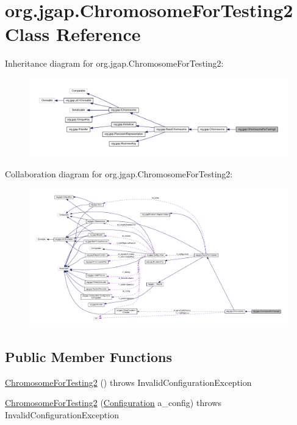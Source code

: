 \hypertarget{classorg_1_1jgap_1_1_chromosome_for_testing2}{\section{org.\-jgap.\-Chromosome\-For\-Testing2 Class Reference}
\label{classorg_1_1jgap_1_1_chromosome_for_testing2}
}


Inheritance diagram for org.\-jgap.\-Chromosome\-For\-Testing2\-:
\nopagebreak
\begin{figure}[H]
\begin{center}
\leavevmode
\includegraphics[width=350pt]{classorg_1_1jgap_1_1_chromosome_for_testing2__inherit__graph}
\end{center}
\end{figure}


Collaboration diagram for org.\-jgap.\-Chromosome\-For\-Testing2\-:
\nopagebreak
\begin{figure}[H]
\begin{center}
\leavevmode
\includegraphics[width=350pt]{classorg_1_1jgap_1_1_chromosome_for_testing2__coll__graph}
\end{center}
\end{figure}
\subsection*{Public Member Functions}
\begin{DoxyCompactItemize}
\item 
\hyperlink{classorg_1_1jgap_1_1_chromosome_for_testing2_a6d8476250d738933105dc7c1514214c6}{Chromosome\-For\-Testing2} ()  throws Invalid\-Configuration\-Exception 
\item 
\hyperlink{classorg_1_1jgap_1_1_chromosome_for_testing2_a531ffcf192a47f69abaa0c175ac2d627}{Chromosome\-For\-Testing2} (\hyperlink{classorg_1_1jgap_1_1_configuration}{Configuration} a\-\_\-config)  throws Invalid\-Configuration\-Exception 
\end{DoxyCompactItemize}

